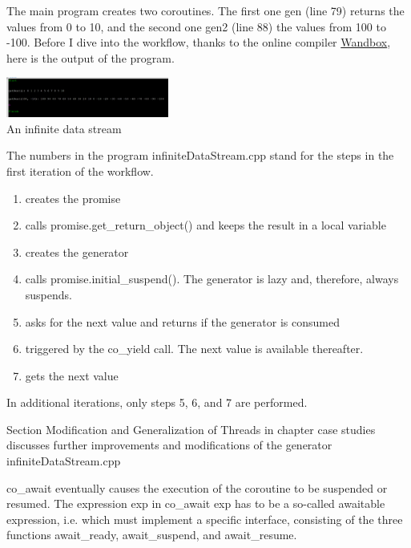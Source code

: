 The main program creates two coroutines. The first one gen (line 79) returns the values from 0 to 10, and the second one gen2 (line 88) the values from 100 to -100. Before I dive into the workflow, thanks to the online compiler \href{https://wandbox.org/}{Wandbox}, here is the output of the program.

\begin{center}
\includegraphics[width=0.4\textwidth]{content/3/chapter6/images/5.png}\\
An infinite data stream
\end{center}

The numbers in the program infiniteDataStream.cpp stand for the steps in the first iteration of the workflow.

\begin{enumerate}
\item 
creates the promise

\item 
calls promise.get\_return\_object() and keeps the result in a local variable

\item 
creates the generator

\item 
calls promise.initial\_suspend(). The generator is lazy and, therefore, always suspends.

\item 
asks for the next value and returns if the generator is consumed

\item 
triggered by the co\_yield call. The next value is available thereafter.

\item 
gets the next value
\end{enumerate}

In additional iterations, only steps 5, 6, and 7 are performed.

Section Modification and Generalization of Threads in chapter case studies discusses further improvements and modifications of the generator infiniteDataStream.cpp


co\_await eventually causes the execution of the coroutine to be suspended or resumed. The expression exp in co\_await exp has to be a so-called awaitable expression, i.e. which must implement a specific interface, consisting of the three functions await\_ready, await\_suspend, and await\_resume.

